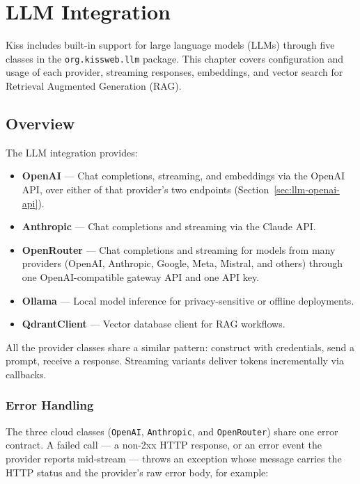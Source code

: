 \chapter{LLM Integration}
\label{ch:llm}

Kiss includes built-in support for large language models (LLMs) through five classes in the \texttt{org.kissweb.llm} package.  This chapter covers configuration and usage of each provider, streaming responses, embeddings, and vector search for Retrieval Augmented Generation (RAG).

\section{Overview}
\label{sec:llm-overview}

The LLM integration provides:

\begin{itemize}
  \item \textbf{OpenAI} --- Chat completions, streaming, and embeddings via the OpenAI API, over either of that provider's two endpoints (Section~\ref{sec:llm-openai-api}).
  \item \textbf{Anthropic} --- Chat completions and streaming via the Claude API.
  \item \textbf{OpenRouter} --- Chat completions and streaming for models from many providers (OpenAI, Anthropic, Google, Meta, Mistral, and others) through one OpenAI-compatible gateway API and one API key.
  \item \textbf{Ollama} --- Local model inference for privacy-sensitive or offline deployments.
  \item \textbf{QdrantClient} --- Vector database client for RAG workflows.
\end{itemize}

\noindent
All the provider classes share a similar pattern: construct with credentials, send a prompt, receive a response.  Streaming variants deliver tokens incrementally via callbacks.

\subsection{Error Handling}
\label{sec:llm-errors}

The three cloud classes (\texttt{OpenAI}, \texttt{Anthropic}, and \texttt{OpenRouter}) share one error contract.  A failed call --- a non-2xx HTTP response, or an error event the provider reports mid-stream --- throws an exception whose message carries the HTTP status and the provider's raw error body, for example:

